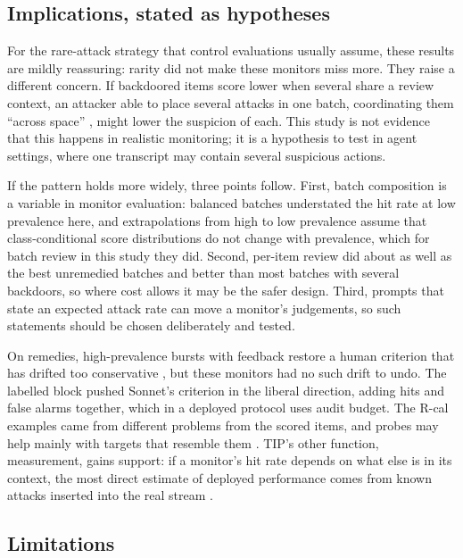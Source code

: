 \documentclass[manuscript, screen, review]{jair}
\begin{document}
\subsection{Implications, stated as hypotheses}\label{sec:implications}

For the rare-attack strategy that control evaluations usually assume, these results are mildly reassuring: rarity did not make these monitors miss more. They raise a different concern. If backdoored items score lower when several share a review context, an attacker able to place several attacks in one batch, coordinating them ``across space'' \parencite[Sec.~6]{korbak2025}, might lower the suspicion of each. This study is not evidence that this happens in realistic monitoring; it is a hypothesis to test in agent settings, where one transcript may contain several suspicious actions.

If the pattern holds more widely, three points follow. First, batch composition is a variable in monitor evaluation: balanced batches understated the hit rate at low prevalence here, and extrapolations from high to low prevalence \parencite{srivastav2026,abbasi2026} assume that class-conditional score distributions do not change with prevalence, which for batch review in this study they did. Second, per-item review did about as well as the best unremedied batches and better than most batches with several backdoors, so where cost allows it may be the safer design. Third, prompts that state an expected attack rate can move a monitor's judgements, so such statements should be chosen deliberately and tested.

On remedies, high-prevalence bursts with feedback restore a human criterion that has drifted too conservative \parencite[Experiment~7]{wolfe2007}, but these monitors had no such drift to undo. The labelled block pushed Sonnet's criterion in the liberal direction, adding hits and false alarms together, which in a deployed protocol uses audit budget. The R-cal examples came from different problems from the scored items, and probes may help mainly with targets that resemble them \parencite{becker2026}. TIP's other function, measurement, gains support: if a monitor's hit rate depends on what else is in its context, the most direct estimate of deployed performance comes from known attacks inserted into the real stream \parencite{korbak2025,buser2025}.

\subsection{Limitations}\label{sec:limitations}
\end{document}
